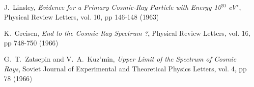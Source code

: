 \documentclass[10pt,a4paper,twoside]{report}
\begin{document}
\def\etal{\textit{et al.}}

\renewcommand{\bibname}{References}

\begin{thebibliography}{9}
  

 J.~Linsley, {\em Evidence for a Primary Cosmic-Ray
  Particle with Energy 10$^{20}$ eV}", Physical Review Letters,
  vol. 10, pp 146-148 (1963)

 K.~Greisen, {\em End to the Cosmic-Ray Spectrum ?},
  Physical Review Letters, vol. 16, pp 748-750 (1966)

 G.~T.~Zatsepin and V.~A.~Kuz'min, {\em Upper Limit
  of the Spectrum of Cosmic Rays}, Soviet Journal of Experimental and
  Theoretical Physics Letters, vol. 4, pp 78 (1966)

\end{thebibliography}
\end{document}
